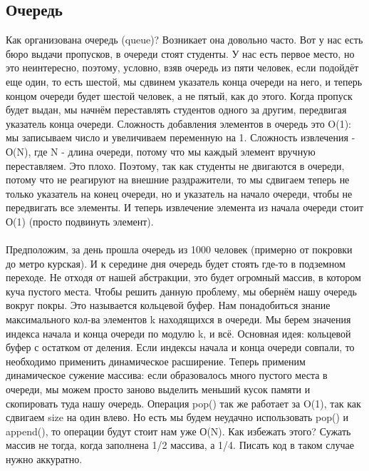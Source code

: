 \documentclass[a4paper,12pt]{article}
\begin{document}
\subsection{Очередь}
Как организована очередь (queue)? Возникает она довольно часто. Вот у нас есть бюро выдачи пропусков, в очереди стоят студенты. У нас есть первое место, но это неинтересно, поэтому, условно, взяв очередь из пяти человек, если подойдёт еще один, то есть шестой, мы сдвинем указатель конца очереди на него, и теперь концом очереди будет шестой человек, а не пятый, как до этого. Когда пропуск будет выдан, мы начнём переставлять студентов одного за другим, передвигая указатель конца очереди. Сложность добавления элементов в очередь это O(1): мы записываем число и увеличиваем переменную на 1. Сложность извлечения - О(N), где N - длина очереди, потому что мы каждый элемент вручную переставляем. Это плохо. Поэтому, так как студенты не двигаются в очереди, потому что не реагируют на внешние раздражители, то мы сдвигаем теперь не только указатель на конец очереди, но и указатель на начало очереди, чтобы не передвигать все элементы. И теперь извлечение элемента из начала очереди стоит О(1) (просто подвинуть элемент). 
\\
\\Предположим, за день прошла очередь из 1000 человек (примерно от покровки до метро курская). И к середине дня очередь будет стоять где-то в подземном переходе. Не отходя от нашей абстракции, это будет огромный массив, в котором куча пустого места. Чтобы решить данную проблему, мы обернём нашу очередь вокруг покры. Это называется кольцевой буфер. Нам понадобиться знание максимального кол-ва элементов k находящихся в очереди. Мы берем значения индекса начала и конца очереди по модулю k, и всё. Основная идея: кольцевой буфер с остатком от деления. Если индексы начала и конца очереди совпали, то необходимо применить динамическое расширение. Теперь применим динамическое сужение массива: если образовалось много пустого места в очереди, мы можем просто заново выделить меньший кусок памяти и скопировать туда нашу очередь. Операция pop() так же работает за O(1), так как сдвигаем size на один влево. Но есть мы будем неудачно использовать pop() и append(), то операции будут стоит нам уже О(N). Как избежать этого? Сужать массив не тогда, когда заполнена 1/2 массива, а 1/4. Писать код в таком случае нужно аккуратно.
\end{document}
